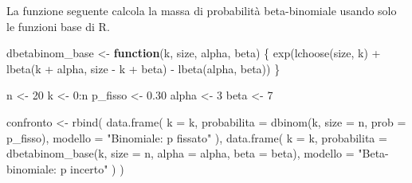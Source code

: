\documentclass[
  italian,
  letterpaper,
  a4paper,
  11pt,
  open=any]{scrbook}
\newenvironment{Shaded}{\begin{snugshade}}{\end{snugshade}}
\newcommand{\AttributeTok}[1]{\textcolor[rgb]{0.40,0.45,0.13}{#1}}
\newcommand{\ControlFlowTok}[1]{\textcolor[rgb]{0.00,0.23,0.31}{\textbf{#1}}}
\newcommand{\DecValTok}[1]{\textcolor[rgb]{0.68,0.00,0.00}{#1}}
\newcommand{\FloatTok}[1]{\textcolor[rgb]{0.68,0.00,0.00}{#1}}
\newcommand{\FunctionTok}[1]{\textcolor[rgb]{0.28,0.35,0.67}{#1}}
\newcommand{\NormalTok}[1]{\textcolor[rgb]{0.00,0.23,0.31}{#1}}
\newcommand{\OtherTok}[1]{\textcolor[rgb]{0.00,0.23,0.31}{#1}}
\newcommand{\SpecialCharTok}[1]{\textcolor[rgb]{0.37,0.37,0.37}{#1}}
\newcommand{\StringTok}[1]{\textcolor[rgb]{0.13,0.47,0.30}{#1}}
\theoremstyle{plain}
\theoremstyle{definition}
\theoremstyle{definition}
\theoremstyle{remark}
\begin{document}
\begin{tcolorbox}[enhanced jigsaw, arc=.35mm, bottomrule=.15mm, bottomtitle=1mm, breakable, colback=white, colbacktitle=quarto-callout-note-color!10!white, colframe=quarto-callout-note-color-frame, coltitle=black, left=2mm, leftrule=.75mm, opacityback=0, opacitybacktitle=0.6, rightrule=.15mm, title=\textcolor{quarto-callout-note-color}{\faInfo}\hspace{0.5em}{Anteprima opzionale: beta-binomiale senza pacchetti esterni}, titlerule=0mm, toprule=.15mm, toptitle=1mm]

La funzione seguente calcola la massa di probabilità beta-binomiale
usando solo le funzioni base di R.

\begin{Shaded}
\begin{Highlighting}[]
\NormalTok{dbetabinom\_base }\OtherTok{\textless{}{-}} \ControlFlowTok{function}\NormalTok{(k, size, alpha, beta) \{}
  \FunctionTok{exp}\NormalTok{(}\FunctionTok{lchoose}\NormalTok{(size, k) }\SpecialCharTok{+} \FunctionTok{lbeta}\NormalTok{(k }\SpecialCharTok{+}\NormalTok{ alpha, size }\SpecialCharTok{{-}}\NormalTok{ k }\SpecialCharTok{+}\NormalTok{ beta) }\SpecialCharTok{{-}} \FunctionTok{lbeta}\NormalTok{(alpha, beta))}
\NormalTok{\}}

\NormalTok{n }\OtherTok{\textless{}{-}} \DecValTok{20}
\NormalTok{k }\OtherTok{\textless{}{-}} \DecValTok{0}\SpecialCharTok{:}\NormalTok{n}
\NormalTok{p\_fisso }\OtherTok{\textless{}{-}} \FloatTok{0.30}
\NormalTok{alpha }\OtherTok{\textless{}{-}} \DecValTok{3}
\NormalTok{beta }\OtherTok{\textless{}{-}} \DecValTok{7}

\NormalTok{confronto }\OtherTok{\textless{}{-}} \FunctionTok{rbind}\NormalTok{(}
  \FunctionTok{data.frame}\NormalTok{(}
    \AttributeTok{k =}\NormalTok{ k,}
    \AttributeTok{probabilita =} \FunctionTok{dbinom}\NormalTok{(k, }\AttributeTok{size =}\NormalTok{ n, }\AttributeTok{prob =}\NormalTok{ p\_fisso),}
    \AttributeTok{modello =} \StringTok{"Binomiale: p fissato"}
\NormalTok{  ),}
  \FunctionTok{data.frame}\NormalTok{(}
    \AttributeTok{k =}\NormalTok{ k,}
    \AttributeTok{probabilita =} \FunctionTok{dbetabinom\_base}\NormalTok{(k, }\AttributeTok{size =}\NormalTok{ n, }\AttributeTok{alpha =}\NormalTok{ alpha, }\AttributeTok{beta =}\NormalTok{ beta),}
    \AttributeTok{modello =} \StringTok{"Beta{-}binomiale: p incerto"}
\NormalTok{  )}
\NormalTok{)}


\end{Highlighting}
\end{Shaded}
\end{tcolorbox}
\end{document}
